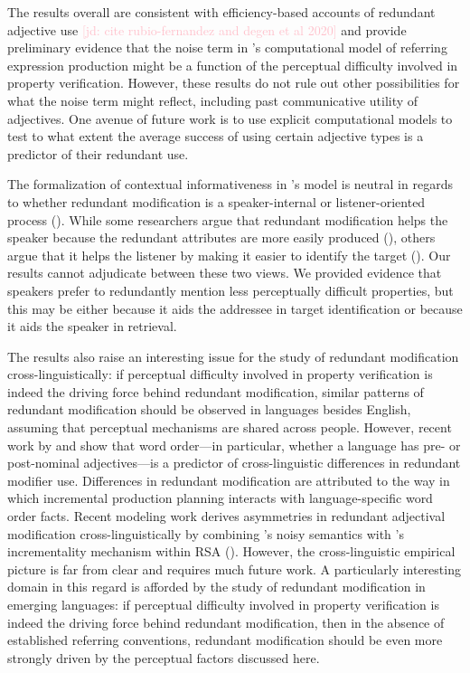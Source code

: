 \documentclass[12pt,letterpaper]{article}
\newcommand{\jd}[1]{\textcolor{Pink}{[jd: #1]}}
\begin{document}
The results overall are consistent with efficiency-based accounts of redundant adjective use \jd{cite rubio-fernandez and degen et al 2020} and provide preliminary evidence that the noise term in \citet{DegenEtAl2020}'s computational model of referring expression production might be a function of the perceptual difficulty involved in property verification. However, these results do not rule out other possibilities for what the noise term might reflect, including past communicative utility of adjectives. One avenue of future work is to use explicit computational models to test to what extent the average success of using certain adjective types is a predictor of their redundant use. 

The formalization of contextual informativeness in \citet{DegenEtAl2020}'s model is neutral in regards to whether redundant modification is a speaker-internal or listener-oriented process (\citealt{Arnold2008}). While some researchers argue that redundant modification helps the speaker because the redundant attributes are more easily produced (\citealt{DaviesKatsos2013, KoolenEtAl2013}), others argue that it helps the listener by making it easier to identify the target (\citealt{FussellKraus1989a, ArtsEtAl2011,RubioFernandez2016,Rehrig2021}). Our results cannot adjudicate between these two views. We provided evidence that speakers prefer to redundantly mention less perceptually difficult properties, but this may be either because it aids the addressee in target identification or because it aids the speaker in retrieval. 

The results also raise an interesting issue for the study of redundant modification cross-linguistically: if perceptual difficulty involved in property verification is indeed the driving force behind redundant modification, similar patterns of redundant modification should be observed in languages besides English, assuming that perceptual mechanisms are shared across people. However, recent work by \citet{Rubio2020} and \citet{WuGibson2021} show that word order---in particular, whether a language has pre- or post-nominal adjectives---is a predictor of  cross-linguistic differences in redundant modifier use. Differences in redundant modification are attributed to the way in which incremental production planning interacts with language-specific word order facts. Recent modeling work  derives asymmetries in redundant adjectival modification cross-linguistically by combining \citet{DegenEtAl2020}'s noisy semantics with \citet{CohnGordon2018}'s incrementality mechanism within RSA (\citealt{WaldonDegen2021}). However, the cross-linguistic empirical picture is far from clear and requires much future work. A particularly interesting domain in this regard is afforded by the study of redundant modification in emerging languages: if perceptual difficulty involved in property verification is indeed the driving force behind redundant modification, then in the absence of established referring conventions, redundant modification should be even more strongly driven by the perceptual factors discussed here.
\end{document}
